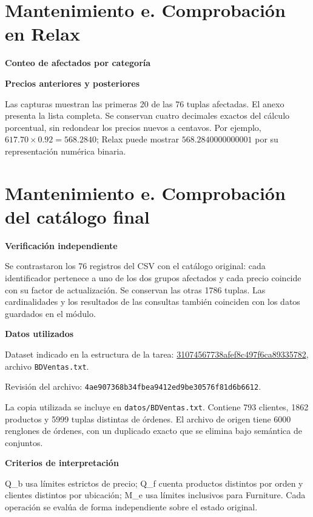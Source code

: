 \clearpage
\section*{Mantenimiento e. Comprobación en Relax}
\textbf{Conteo de afectados por categoría}

\textbf{Precios anteriores y posteriores}

\begin{center}
\begin{minipage}{.48\linewidth}\end{minipage}\hfill
\begin{minipage}{.48\linewidth}\end{minipage}
\end{center}
Las capturas muestran las primeras 20 de las 76 tuplas afectadas. El anexo presenta la lista completa. Se conservan cuatro decimales exactos del cálculo porcentual, sin redondear los precios nuevos a centavos. Por ejemplo, $617.70\times0.92=568.2840$; Relax puede mostrar $568.2840000000001$ por su representación numérica binaria.

\clearpage
\section*{Mantenimiento e. Comprobación del catálogo final}

\textbf{Verificación independiente}\par
Se contrastaron los 76 registros del CSV con el catálogo original: cada identificador pertenece a uno de los dos grupos afectados y cada precio coincide con su factor de actualización. Se conservan las otras 1786 tuplas. Las cardinalidades y los resultados de las consultas también coinciden con los datos guardados en el módulo.

\textbf{Datos utilizados}\par
Dataset indicado en la estructura de la tarea: \href{https://gist.github.com/cyrus96/31074567738afef8c497f6ca89335782}{31074567738afef8c497f6ca89335782}, archivo \texttt{BDVentas.txt}.\par
Revisión del archivo: \texttt{4ae907368b34fbea9412ed9be30576f81d6b6612}.\par
La copia utilizada se incluye en \texttt{datos/BDVentas.txt}. Contiene 793 clientes, 1862 productos y 5999 tuplas distintas de órdenes. El archivo de origen tiene 6000 renglones de órdenes, con un duplicado exacto que se elimina bajo semántica de conjuntos.

\textbf{Criterios de interpretación}\par
Q\_b usa límites estrictos de precio; Q\_f cuenta productos distintos por orden y clientes distintos por ubicación; M\_e usa límites inclusivos para Furniture. Cada operación se evalúa de forma independiente sobre el estado original.
